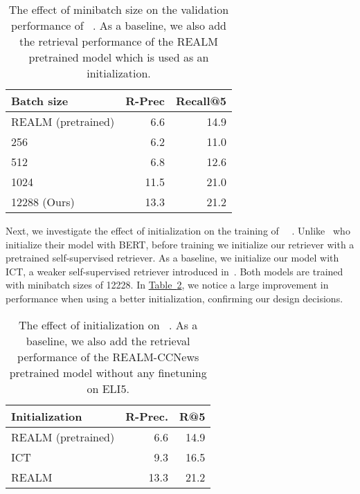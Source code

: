 \documentclass[11pt]{article}
\newcommand{\namedref}[2]{\hyperref[#2]{#1~\ref*{#2}}}
\newcommand{\tableref}[1]{\namedref{Table}{#1}}
\newcommand{\retriever}[1]{\textsc{c-REALM}}
\begin{document}
\begin{table}[h]
\begin{center}
\begin{tabular}{ lrr } 
 \toprule
Batch size & R-Prec & Recall@5 \\
\midrule
REALM (pretrained) & 6.6 & 14.9 \\
\midrule
256 & 6.2 & 11.0 \\
512~\citep{jernite2020} & 6.8 & 12.6 \\
1024 & 11.5 & 21.0 \\
12288 (Ours) & 13.3 & 21.2 \\
\bottomrule
\end{tabular}
\end{center}
\caption{The effect of minibatch size on the validation performance of \retriever~. As a baseline, we also add the retrieval performance of the REALM pretrained model which is used as an initialization.}
\label{tab:crealm_batch_size}
\end{table}

Next, we investigate the effect of initialization on the training of ~\retriever~. Unlike~\citet{jernite2020} who initialize their model with BERT, before training we initialize our retriever with a pretrained self-supervised retriever. As a baseline, we initialize our model with ICT, a weaker self-supervised retriever introduced in~\citet{lee-etal-2019-latent}. Both models are trained with minibatch sizes of 12228. In \tableref{tab:crealm_init}, we notice a large improvement in performance when using a better initialization, confirming our design decisions.

\begin{table}[h]
\begin{center}
\begin{tabular}{ lrr } 
 \toprule
Initialization & R-Prec. & R@5 \\
\midrule
REALM (pretrained) & 6.6 & 14.9 \\
\midrule
ICT~\citep{lee-etal-2019-latent} & 9.3 & 16.5 \\
REALM~\citep{guu2020realm} & 13.3 & 21.2 \\
\bottomrule
\end{tabular}
\end{center}
\caption{The effect of initialization on \retriever~. As a baseline, we also add the retrieval performance of the REALM-CCNews pretrained model without any finetuning on ELI5. }
\label{tab:crealm_init}
\end{table}
\end{document}
